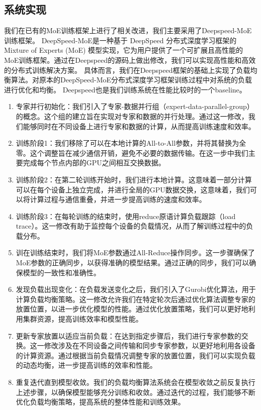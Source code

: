 \subsection{系统实现}

我们在已有的MoE训练框架上进行了相关改进，我们主要采用了Deepspeed-MoE训练框架。
% 
DeepSpeed-MoE是一种基于 DeepSpeed 分布式深度学习框架的 Mixture of Experts (MoE) 模型实现，它为用户提供了一个可扩展且高性能的MoE训练框架。通过在Deepspeed的源码上做出修改，我们可以实现高性能和高效的分布式训练解决方案。
% 
具体而言，我们在Deepspeed框架的基础上实现了负载均衡算法。对原本的DeepSpeed-MoE分布式深度学习框架训练过程中对系统的负载进行优化和均衡。
% 
Deepspeed也是我们训练系统在性能比较时的一个baseline。


\begin{enumerate}
    \item 专家并行初始化：我们引入了专家-数据并行组（expert-data-parallel-group）的概念。这个组的建立旨在实现对专家和数据的并行处理。通过这一修改，我们能够同时在不同设备上进行专家和数据的计算，从而提高训练速度和效率。
    \item 训练阶段1：我们移除了可以在本地计算的All-to-All参数，并将其替换为全零。这个调整旨在减少通信开销，避免不必要的数据传输。在这一步中我们主要完成每个节点内部的GPU之间相互交换数据。
    \item 训练阶段2：在第二轮训练开始时，我们进行本地计算。这意味着一部分计算可以在每个设备上独立完成，并进行全局的GPU数据交换，这意味着，我们可以将计算过程与通信重叠，并进一步提高训练的速度和效率。
    \item 训练阶段3：在每轮训练的结束时，使用reduce原语计算负载跟踪（load trace）。这一修改有助于监控每个设备的负载情况，从而了解训练过程中的负载分布。
    \item 训在训练结束时，我们将MoE参数通过All-Reduce操作同步。这一步骤确保了MoE参数的正确同步，以获得准确的模型结果。通过正确的同步，我们可以确保模型的一致性和准确性。
    \item 发现负载出现变化：在负载发送变化之后，我们引入了Gurobi优化算法，用于计算负载均衡策略。这一修改允许我们在特定轮次后通过优化算法调整专家的放置位置，以进一步优化模型的性能。通过优化放置策略，我们可以更好地利用集群资源，提高训练效率和模型性能。
    \item 更新专家放置以适应当前负载：在达到指定步骤后，我们进行专家参数的交换。这一修改涉及在不同设备之间传输和同步专家参数，以更好地利用各设备的计算资源。通过根据当前负载情况调整专家的放置位置，我们可以实现负载的动态均衡，进一步提高训练的效率和性能。
    \item 重复迭代直到模型收敛。我们的负载均衡算法系统会在模型收敛之前反复执行上述步骤，以确保模型能够充分训练和收敛。通过迭代的过程，我们能够不断优化负载均衡策略，提高系统的整体性能和训练效果。

\end{enumerate}

